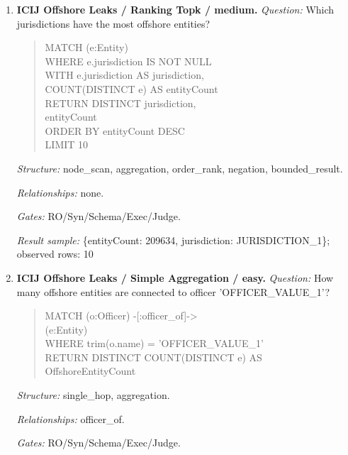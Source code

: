 \begin{enumerate}
\begin{quote}
dstRel.start\_date AS ConnectionStartDate\\
LIMIT 300
\end{quote}
\textit{Structure:} join\_heavy, negation, bounded\_result.\par
\textit{Relationships:} officer\_of.\par
\textit{Gates:} RO/Syn/Schema/Exec/Judge.\par
\textit{Result sample:} \{ConnectionStartDate: DATE\_1, OfficerId: OFFICER\_ID\_1, OfficerName: OFFICER\_NAME\_1\}; observed rows: 15
\item \textbf{ICIJ Offshore Leaks / Ranking Topk / medium.}
\textit{Question:} Which jurisdictions have the most offshore entities?
\begin{quote}\scriptsize\ttfamily\raggedright\sloppy
MATCH (e:Entity)\\
WHERE e.jurisdiction IS NOT NULL\\
WITH e.jurisdiction AS jurisdiction,\\
COUNT(DISTINCT e) AS entityCount\\
RETURN DISTINCT jurisdiction,\\
entityCount\\
ORDER BY entityCount DESC\\
LIMIT 10
\end{quote}
\textit{Structure:} node\_scan, aggregation, order\_rank, negation, bounded\_result.\par
\textit{Relationships:} none.\par
\textit{Gates:} RO/Syn/Schema/Exec/Judge.\par
\textit{Result sample:} \{entityCount: 209634, jurisdiction: JURISDICTION\_1\}; observed rows: 10
\item \textbf{ICIJ Offshore Leaks / Simple Aggregation / easy.}
\textit{Question:} How many offshore entities are connected to officer 'OFFICER\_VALUE\_1'?
\begin{quote}\scriptsize\ttfamily\raggedright\sloppy
MATCH (o:Officer) -[:officer\_of]-\textgreater{}\\
(e:Entity)\\
WHERE trim(o.name) = 'OFFICER\_VALUE\_1'\\
RETURN DISTINCT COUNT(DISTINCT e) AS\\
OffshoreEntityCount
\end{quote}
\textit{Structure:} single\_hop, aggregation.\par
\textit{Relationships:} officer\_of.\par
\textit{Gates:} RO/Syn/Schema/Exec/Judge.\par

\end{enumerate}

